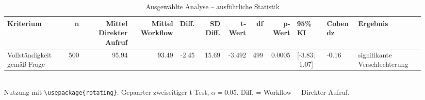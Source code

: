 \begin{table}
\centering
\caption{Ausgewählte Analyse -- ausführliche Statistik}
\begin{tabular}{lrrrrrrrrlll}
\toprule
Kriterium & n & Mittel Direkter Aufruf & Mittel Workflow & Diff. & SD Diff. & t-Wert & df & p-Wert & 95\% KI & Cohen dz & Ergebnis \\
\midrule
Vollständigkeit gemäß Frage & 500 & 95.94 & 93.49 & -2.45 & 15.69 & -3.492 & 499 & 0.0005 & [-3.83; -1.07] & -0.16 & signifikante Verschlechterung \\
\bottomrule
\end{tabular}
\\[2mm]
\footnotesize Nutzung mit \texttt{\textbackslash usepackage\{rotating\}}. Gepaarter zweiseitiger t-Test, $\alpha=0.05$. Diff. = Workflow $-$ Direkter Aufruf.
\end{table}
